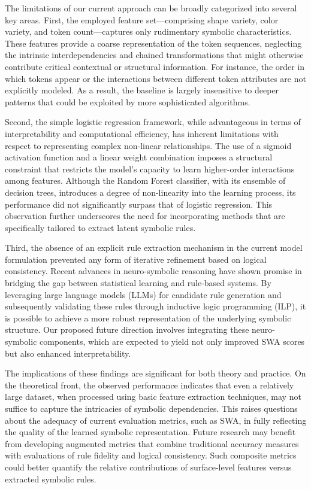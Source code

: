 \documentclass{article}
\begin{document}
The limitations of our current approach can be broadly categorized into several key areas. First, the employed feature set—comprising shape variety, color variety, and token count—captures only rudimentary symbolic characteristics. These features provide a coarse representation of the token sequences, neglecting the intrinsic interdependencies and chained transformations that might otherwise contribute critical contextual or structural information. For instance, the order in which tokens appear or the interactions between different token attributes are not explicitly modeled. As a result, the baseline is largely insensitive to deeper patterns that could be exploited by more sophisticated algorithms.

Second, the simple logistic regression framework, while advantageous in terms of interpretability and computational efficiency, has inherent limitations with respect to representing complex non-linear relationships. The use of a sigmoid activation function and a linear weight combination imposes a structural constraint that restricts the model’s capacity to learn higher-order interactions among features. Although the Random Forest classifier, with its ensemble of decision trees, introduces a degree of non-linearity into the learning process, its performance did not significantly surpass that of logistic regression. This observation further underscores the need for incorporating methods that are specifically tailored to extract latent symbolic rules.

Third, the absence of an explicit rule extraction mechanism in the current model formulation prevented any form of iterative refinement based on logical consistency. Recent advances in neuro-symbolic reasoning have shown promise in bridging the gap between statistical learning and rule-based systems. By leveraging large language models (LLMs) for candidate rule generation and subsequently validating these rules through inductive logic programming (ILP), it is possible to achieve a more robust representation of the underlying symbolic structure. Our proposed future direction involves integrating these neuro-symbolic components, which are expected to yield not only improved SWA scores but also enhanced interpretability.

The implications of these findings are significant for both theory and practice. On the theoretical front, the observed performance indicates that even a relatively large dataset, when processed using basic feature extraction techniques, may not suffice to capture the intricacies of symbolic dependencies. This raises questions about the adequacy of current evaluation metrics, such as SWA, in fully reflecting the quality of the learned symbolic representation. Future research may benefit from developing augmented metrics that combine traditional accuracy measures with evaluations of rule fidelity and logical consistency. Such composite metrics could better quantify the relative contributions of surface-level features versus extracted symbolic rules.
\end{document}
